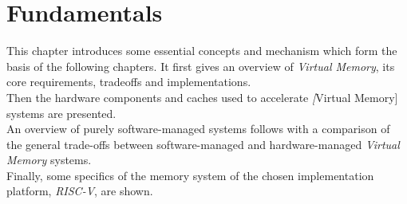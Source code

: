 \chapter{Fundamentals} %
\label{chap:fund}

%



This chapter introduces some essential concepts and mechanism which form the basis of the following
chapters. It first gives an overview of \textit{Virtual Memory}, its core requirements,
tradeoffs and implementations.\\
Then the hardware components and caches used to accelerate \textit[Virtual Memory] systems are
presented.\\
An overview of purely software-managed systems follows with a comparison of the general trade-offs
between software-managed and hardware-managed \textit{Virtual Memory} systems.\\
Finally, some specifics of the memory system of the chosen implementation platform, \textit{RISC-V},
are shown.


